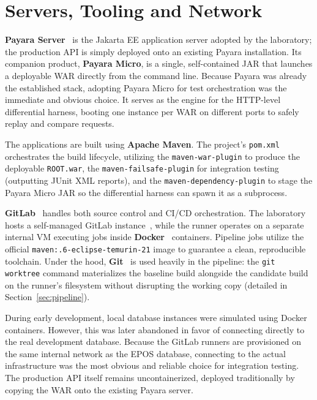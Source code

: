 \section{Servers, Tooling and Network}
\label{sec:servers}

\textbf{Payara Server}~\cite{payara} is the Jakarta EE application server adopted
by the laboratory; the production \ac{API} is simply deployed onto an existing
Payara installation. Its companion product, \textbf{Payara Micro}, is a single,
self-contained \ac{JAR} that launches a deployable \ac{WAR} directly from
the command line. Because Payara was already the established stack,
adopting Payara Micro for test orchestration was the immediate and obvious
choice. It serves as the engine for the \ac{HTTP}-level differential
harness, booting one instance per \ac{WAR} on different ports to safely
replay and compare requests.

The applications are built using \textbf{Apache Maven}. The project's
\texttt{pom.xml} orchestrates the build lifecycle, utilizing the \texttt{maven-war-plugin}
to produce the deployable \texttt{ROOT.war}, the \texttt{maven-failsafe-plugin}
for integration testing (outputting JUnit \ac{XML} reports), and the
\texttt{maven-dependency-plugin} to stage the Payara Micro \ac{JAR} so the
differential harness can spawn it as a subprocess.

\textbf{GitLab}~\cite{gitlabci} handles both source control and \ac{CI}/\ac{CD}
orchestration. The laboratory hosts a self-managed GitLab instance~\cite{gitlabSelfManaged},
while the runner operates on a separate internal \ac{VM} executing jobs
inside \textbf{Docker}~\cite{docker} containers. Pipeline jobs utilize the
official \texttt{maven:.6-eclipse-\allowbreak temurin-21} image
to guarantee a clean, reproducible toolchain. Under the hood, \textbf{Git}~\cite{git}
is used heavily in the pipeline: the \texttt{git worktree} command materializes
the baseline build alongside the candidate build on the runner's filesystem without
disrupting the working copy (detailed in Section~\ref{sec:pipeline}).

During early development, local database instances were simulated using
Docker containers. However, this was later abandoned in favor of connecting
directly to the real development database. Because the GitLab runners are provisioned
on the same internal network as the \ac{EPOS} database, connecting to the actual
infrastructure was the most obvious and reliable choice for integration testing.
The production \ac{API} itself remains uncontainerized, deployed
traditionally by copying the \ac{WAR} onto the existing Payara server.

